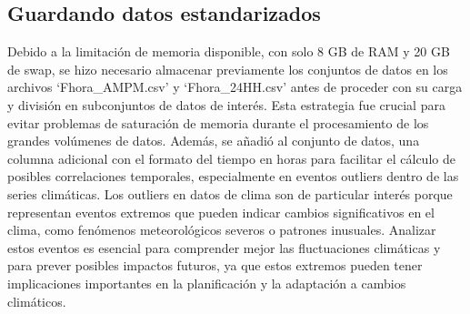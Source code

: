 \documentclass[11pt]{article}
\begin{document}
    \hypertarget{guardando-datos-estandarizados}{%
\subsection{Guardando datos
estandarizados}\label{guardando-datos-estandarizados}}

    Debido a la limitación de memoria disponible, con solo 8 GB de RAM y 20
GB de swap, se hizo necesario almacenar previamente los conjuntos de
datos en los archivos `Fhora\_AMPM.csv' y `Fhora\_24HH.csv' antes de
proceder con su carga y división en subconjuntos de datos de interés.
Esta estrategia fue crucial para evitar problemas de saturación de
memoria durante el procesamiento de los grandes volúmenes de datos.
Además, se añadió al conjunto de datos, una columna adicional con el
formato del tiempo en horas para facilitar el cálculo de posibles
correlaciones temporales, especialmente en eventos outliers dentro de
las series climáticas. Los outliers en datos de clima son de particular
interés porque representan eventos extremos que pueden indicar cambios
significativos en el clima, como fenómenos meteorológicos severos o
patrones inusuales. Analizar estos eventos es esencial para comprender
mejor las fluctuaciones climáticas y para prever posibles impactos
futuros, ya que estos extremos pueden tener implicaciones importantes en
la planificación y la adaptación a cambios climáticos.
\end{document}
